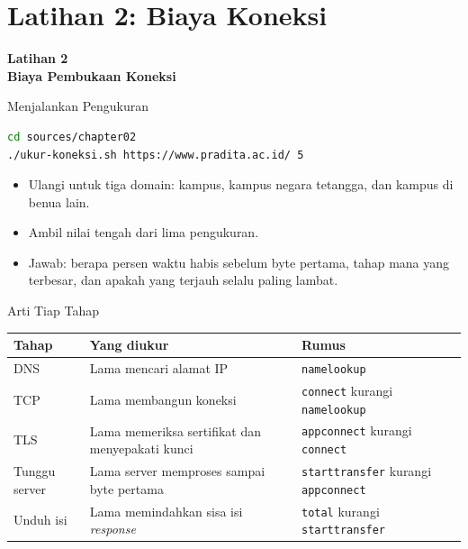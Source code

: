 \documentclass[aspectratio=169, table, 12pt]{beamer}
\begin{document}
\section{Latihan 2: Biaya Koneksi}

\begin{frame}{\hfill}
  \centering
  \Huge{\textbf{Latihan 2\\Biaya Pembukaan Koneksi}}
\end{frame}

\begin{frame}[fragile]{{\Large Menjalankan Pengukuran}}
  \vspace{3pt}
\begin{lstlisting}[language=bash]
cd sources/chapter02
./ukur-koneksi.sh https://www.pradita.ac.id/ 5
\end{lstlisting}

  \vspace{3pt}
  \begin{itemize}
    \item Ulangi untuk tiga domain: kampus, kampus negara tetangga, dan
          kampus di benua lain.
    \item Ambil nilai tengah dari lima pengukuran.
    \item Jawab: berapa persen waktu habis sebelum byte pertama, tahap mana
          yang terbesar, dan apakah yang terjauh selalu paling lambat.
  \end{itemize}
\end{frame}

\begin{frame}{{\Large Arti Tiap Tahap}}
  \vspace{5pt}
  \centering
  {\small
  \begin{tabularx}{0.97\textwidth}{lXX}
    \hline
    \textbf{Tahap} & \textbf{Yang diukur} & \textbf{Rumus} \\
    \hline
    DNS & Lama mencari alamat IP & \texttt{namelookup} \\
    \hline
    TCP & Lama membangun koneksi & \texttt{connect} kurangi \texttt{namelookup} \\
    \hline
    TLS & Lama memeriksa sertifikat dan menyepakati kunci & \texttt{appconnect} kurangi \texttt{connect} \\
    \hline
    Tunggu server & Lama server memproses sampai byte pertama & \texttt{starttransfer} kurangi \texttt{appconnect} \\
    \hline
    Unduh isi & Lama memindahkan sisa isi \textit{response} & \texttt{total} kurangi \texttt{starttransfer} \\
    \hline
  \end{tabularx}}
\end{frame}
\end{document}
